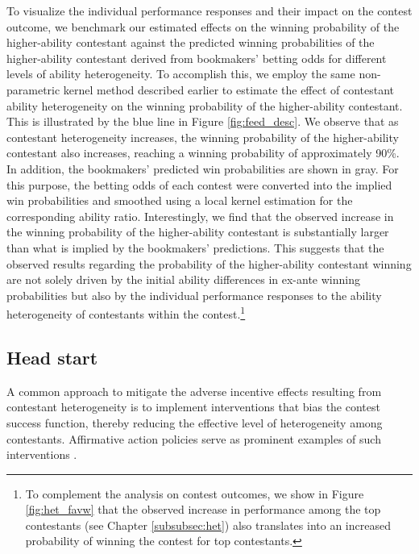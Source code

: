 \documentclass[11pt,a4paper]{article}
\begin{document}
To visualize the individual performance responses and their impact on the contest outcome, we benchmark our estimated effects on the winning probability of the higher-ability contestant against the predicted winning probabilities of the higher-ability contestant derived from bookmakers' betting odds for different levels of ability heterogeneity. To accomplish this, we employ the same non-parametric kernel method described earlier to estimate the effect of contestant ability heterogeneity on the winning probability of the higher-ability contestant. This is illustrated by the blue line in Figure \ref{fig:feed_desc}. We observe that as contestant heterogeneity increases, the winning probability of the higher-ability contestant also increases, reaching a winning probability of approximately 90\%. 
In addition, the bookmakers' predicted win probabilities are shown in gray. For this purpose, the betting odds of each contest were converted into the implied win probabilities and smoothed using a local kernel estimation for the corresponding ability ratio. Interestingly, we find that the observed increase in the winning probability of the higher-ability contestant is substantially larger than what is implied by the bookmakers' predictions. This suggests that the observed results regarding the probability of the higher-ability contestant winning are not solely driven by the initial ability differences in ex-ante winning probabilities but also by the individual performance responses to the ability heterogeneity of contestants within the contest.\footnote{To complement the analysis on contest outcomes, we show in Figure \ref{fig:het_favw} that the observed increase in performance among the top contestants (see Chapter \ref{subsubsec:het}) also translates into an increased probability of winning the contest for top contestants.}\par


\subsection{Head start}\label{subsec:ect}

A common approach to mitigate the adverse incentive effects resulting from contestant heterogeneity is to implement interventions that bias the contest success function, thereby reducing the effective level of heterogeneity among contestants. Affirmative action policies serve as prominent examples of such interventions \cite{Chowdhury.2023, Schildberg.2023}.\par
\end{document}
